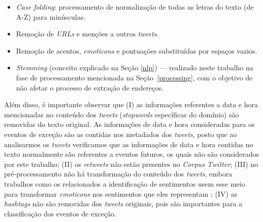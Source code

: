 \documentclass[
	12pt,				%
	oneside,			%
	a4paper,			%
	english,			%
	brazil				%
	]{abntex2ppgsi}
\begin{document}
{{{\begin{itemize}
\item \textit{Case folding}: processamento de normalização de todas as letras do texto (de A-Z) para minúsculas.
\item Remoção de  \textit{URLs} e menções a outros \textit{tweets}.
\item Remoção de acentos, \textit{emoticons} e pontuações substituídas por espaços vazios.
\item \textit{Stemming} (conceito explicado na Seção \ref{nlp})  --- realizado neste trabalho na fase de processamento mencionada na Seção~\ref{processing}, com o objetivo de não afetar o processo de extração de endereços. 
\end{itemize}

Além disso, é importante observar que (I) as informações referentes a data e hora mencionadas no conteúdo dos \textit{tweets} (\textit{stopwords} específicas do domínio) são removidas do texto original. As informações de data e hora consideradas para os eventos de exceção são as contidas nos metadados dos \textit{tweets}, posto que ao analisarmos os \textit{tweets} verificamos que as informações de data e hora contidas no texto normalmente são referentes a eventos futuros, os quais não são considerados por este trabalho; (II) os \textit{retweets} não estão presentes no \textit{Corpus Twitter}; (III) no pré-processamento não há transformação do conteúdo dos \textit{tweets}, embora trabalhos como os relacionados a identificação de sentimentos usem esse meio para transformar \textit{emoticons} nos sentimentos que eles representam \cite{Zagal2016}; (IV) as \textit {hashtags} não são removidas dos \textit{tweets} originais, pois são importantes para a classificação dos eventos de exceção.

}}}
\end{document}
